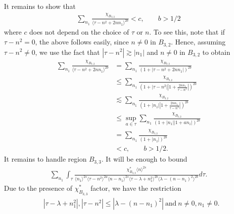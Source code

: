 \documentclass[12pt,reqno]{amsart}
\numberwithin{equation}{section}  %
\begin{document}
%
%
%
It remains to show that 
%
%
%
\begin{equation}
  \label{sum-bound}
\begin{split}
\sum_{n_{1}} \frac{\chi_{B_{3,2}}}{\langle \tau - n^{2} + 2nn_{1}
\rangle^{2b}} < c, \qquad b > 1/2
\end{split}
\end{equation}
%
%
where $c$ does not depend on the choice of $\tau$ or $n$. 
%
%
To see this, note that if $\tau - n^{2} = 0$, the above follows easily, since
$n \neq 0$ in $B_{3,2}$.
Hence, assuming $\tau - n^{2} \neq 0$, we use the fact that $| \tau - n^{2} |
\gtrsim | n_{1} |$ and $n \neq 0$ in $B_{3,2}$ to obtain 
%
%
\begin{equation*}
\begin{split}
\sum_{n_{1}} \frac{\chi_{B_{3,2}}}{\langle \tau - n^{2} + 2nn_{1}
\rangle^{2b}}
& = \sum_{n_{1}} \frac{\chi_{B_{3,2}}}{(1 + | \tau - n^{2} +
2nn_{1} |)^{2b}}
\\
& \le \sum_{n_{1}} \frac{\chi_{B_{3,2}}}{(1 + | \tau - n^{2}
| | 1 + \frac{2nn_{1}}{\tau - n^{2}} |)^{2b}}
\\
& \lesssim \sum_{n_{1}} \frac{\chi_{B_{3,2}}}{(1 + |n_{1}|
| 1 + \frac{2nn_{1}}{\tau - n^{2}} |)^{2b}}
\\
& \le \sup_{a \in \tau} \sum_{n_{1}} \frac{\chi_{B_{3,2}}}{(1 + |n_{1}|
| 1 + an_{1}|)^{2b}}
\\
& = \sum_{n_{1}} \frac{\chi_{B_{3,2}}}{(1 + |n_{1}|)^{2b}}
\\
& < c, \qquad b > 1/2.
\end{split}
\end{equation*}
%
%
It remains to handle region $B_{3,3}$. It will be enough to bound
%
%
\begin{equation}
  \label{region-B-3-star-split}
\begin{split}
   \sum_{n_{1}} \int_{\tau} \frac{\chi^{*}_{B_{3,3}}
    \langle n \rangle ^{2s}
  }{\langle n_{1} \rangle^{2s} \langle  \tau  - n^{2}
    \rangle ^{2a}  \langle
n-n_{1} \rangle ^{2s}  \langle  \tau - \lambda+n_{1}^{2}
\rangle^{2b} \langle   \lambda  -(n - n_{1})^{2}
\rangle^{2b}} d \tau.
\end{split}
\end{equation}
%
Due to the presence of $\chi^{*}_{B_{3,3}}$ factor, we have the restriction
%
%
\begin{equation*}
\begin{split}
& |\tau - \lambda +n_{1}^2|, | \tau - n^{2} | \le |  \lambda -
(n - n_{1})^{2} | \ \text{and} \ n \neq 0, n_1 \neq 0.
\end{split}
\end{equation*}
\end{document}
